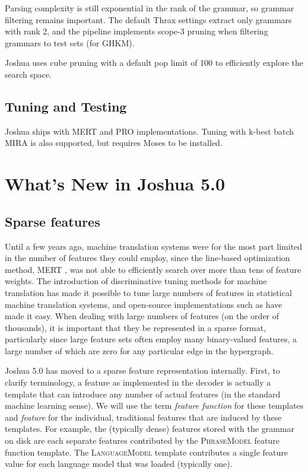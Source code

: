 \documentclass[11pt]{article}
\begin{document}
Parsing complexity is still exponential in the rank of the grammar, so
grammar filtering remains important.  The default Thrax settings
extract only grammars with rank 2, and the pipeline implements scope-3
pruning \cite{hopkins2010scfg} when filtering grammars to test sets
(for GHKM). 

Joshua uses cube pruning \cite{Chiang2007} with a default pop limit of
100 to efficiently explore the search space.

\subsection{Tuning and Testing}

Joshua ships with MERT \cite{Och2003} and PRO implementations.  Tuning
with k-best batch MIRA \cite{cherry2012batch} is also supported, but requires
Moses to be installed.


\section{What's New in Joshua 5.0}

\subsection{Sparse features}
\label{sec:sparse}

Until a few years ago, machine translation systems were for the most
part limited in the number of features they could employ, since the
line-based optimization method, MERT \cite{Och2003}, was not able to
efficiently search over more than tens of feature weights.  The
introduction of discriminative tuning methods for machine translation
\cite{liang2006end,tillmann-zhang:2006:COLACL,chiang2008online,PRO2011}
has made it possible to tune large numbers of features in statistical
machine translation systems, and open-source implementations such as
 have made it easy.  When dealing with large
numbers of features (on the order of thousands), it is important that
they be represented in a sparse format, particularly since large
feature sets often employ many binary-valued features, a large number
of which are zero for any particular edge in the hypergraph.

Joshua 5.0 has moved to a sparse feature representation
internally. First, to clarify terminology, a feature as implemented in
the decoder is actually a template that can introduce any number of
actual features (in the standard machine learning sense). We will use
the term \emph{feature function} for these templates and
\emph{feature} for the individual, traditional features that are
induced by these templates. For example, the (typically dense)
features stored with the grammar on disk are each separate features
contributed by the \textsc{PhraseModel} feature function template. The
\textsc{LanguageModel} template contributes a single feature value for
each language model that was loaded (typically one).
\end{document}
